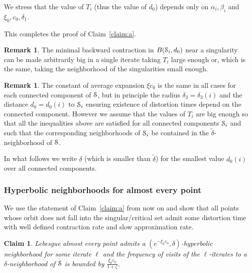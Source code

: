 \documentclass[reqno,12pt,a4paper]{amsart}
\theoremstyle{plain}
\newtheorem{claim}[theorem]{Claim}
\theoremstyle{definition}
\newtheorem{remark}[theorem]{Remark}
\begin{document}
  We stress that the value of $T_i$ (thus the value of
  $d_0$) depends only on $\alpha_i,\beta_i$ and
  $\xi_0,c_0,\delta_1$.

  This completes the proof of Claim~\ref{claim:a}.

  \begin{remark}
    \label{rmk:highexpnearsing}
    The minimal backward contraction in $B({\EuScript{S}}_i,d_0)$ near
    a singularity can be made arbitrarily big in a single
    iterate taking $T_i$ large enough or, which is the same,
    taking the neighborhood of the singularities small enough.
  \end{remark}

  \begin{remark}\label{rmk:exp-const}
    The constant of average expansion $\xi c_0$ is the same
    in all cases for each connected component of ${\EuScript{S}}$, but
    in principle the radius $\delta_3=\delta_3(i)$ and the
    distance $d_0=d_0(i)$ to ${\EuScript{S}}_i$ ensuring existence of
    distortion times depend on the connected
    component. However we assume that the values of $T_i$
    are big enough so that all the inequalities above are
    satisfied for all connected components ${\EuScript{S}}_i$ and such
    that the corresponding neighborhoods of ${\EuScript{S}}_i$ be
    contained in the $\tilde \delta$-neighborhood of ${\EuScript{S}}$.
  \end{remark}

  In what follows we write $\delta$ (which is smaller than
  $\tilde\delta$) for the smallest value $d_0(i)$ over all
  connected components.

\subsubsection{Hyperbolic neighborhoods for almost every point}
\label{sec:hyperb-neighb-almost}

We use the statement of Claim~\ref{claim:a} from now on
and show that all points whose orbit does not fall into the
singular/critical set admit some distortion time with well
defined contraction rate and slow approximation rate.

\begin{claim}
 \label{claim:b}
 Lebesgue almost every point admits a $(e^{-\xi_2
   c_0},\delta)$-hyperbolic neighborhood for some iterate
 $\ell$ and the frequency of visits of the $\ell$-iterates
 to a $\delta$-neighborhood of ${\EuScript{S}}$ is bounded by
 $\frac{\xi_0c_0}{1+\zeta}$.
\end{claim}
\end{document}

